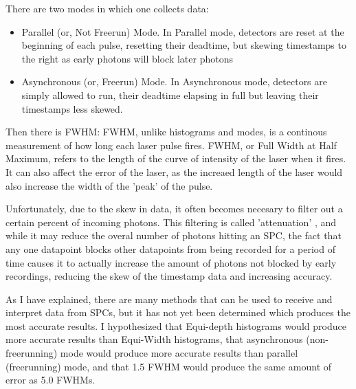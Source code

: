 \documentclass{beamer}
\begin{document}
\begin{frame}
  There are two modes in which one collects data: \cite{sadekar}
  \begin{itemize}
  \item Parallel (or, Not Freerun) Mode. In Parallel mode, detectors are reset at the beginning of each pulse, resetting their deadtime, but skewing timestamps to the right as early photons will block later photons
  \item Asynchronous (or, Freerun) Mode. In Asynchronous mode, detectors are simply allowed to run, their deadtime elapsing in full but leaving their timestamps less skewed.
  \end{itemize}
\end{frame}

\begin{frame}
  Then there is FWHM:
  FWHM, unlike histograms and modes, is a continous measurement of how long each laser pulse fires.
  FWHM, or Full Width at Half Maximum, refers to the length of the curve of intensity of the laser when it fires. It can also affect the error of the laser, as the increaed length of the laser would also increase the width of the 'peak' of the pulse.
\end{frame}

\begin{frame}
  Unfortunately, due to the skew in data, it often becomes necesary to filter out a certain percent of incoming photons. This filtering is called 'attenuation' \cite{ingle}, and while it may reduce the overal number of photons hitting an SPC, the fact that any one datapoint blocks other datapoints from being recorded for a period of time causes it to actually increase the amount of photons not blocked by early recordings, reducing the skew of the timestamp data and increasing accuracy. \cite{sadekar}
\end{frame}

\begin{frame}
  As I have explained, there are many methods that can be used to receive and interpret data from SPCs, but it has not yet been determined which produces the most accurate results. I  hypothesized that Equi-depth histograms would produce more accurate results than Equi-Width histograms, that asynchronous (non-freerunning) mode would produce more accurate results than parallel (freerunning) mode, and that 1.5 FWHM would produce the same amount of error as 5.0 FWHMs.
\end{frame}

\begin{frame}
\end{frame}
\end{document}

